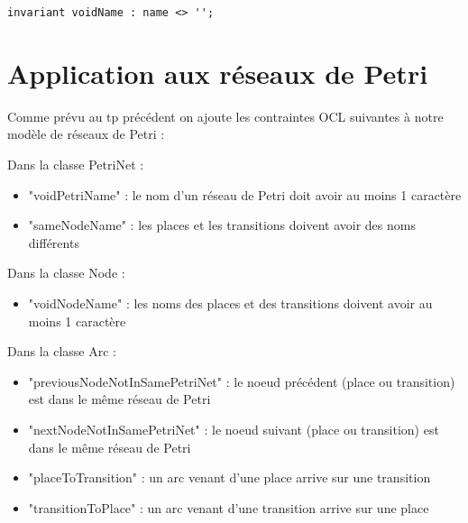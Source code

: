 \begin{lstlisting}[caption="voidName" in WorkDefinition class]
invariant voidName : name <> '';
\end{lstlisting}

\section{Application aux réseaux de Petri}

Comme prévu au tp précédent on ajoute les contraintes OCL suivantes à notre modèle de réseaux de Petri :

Dans la classe PetriNet :
\begin{itemize}
   \item "voidPetriName" : le nom d'un réseau de Petri doit avoir au moins 1 caractère
   \item "sameNodeName" : les places et les transitions doivent avoir des noms différents
\end{itemize}

Dans la classe Node :
\begin{itemize}
   \item "voidNodeName" : les noms des places et des transitions doivent avoir au moins 1 caractère
\end{itemize}

Dans la classe Arc :
\begin{itemize}
   \item "previousNodeNotInSamePetriNet" : le noeud précédent (place ou transition) est dans le même réseau de Petri
   \item "nextNodeNotInSamePetriNet" : le noeud suivant (place ou transition) est dans le même réseau de Petri
   \item "placeToTransition" : un arc venant d'une place arrive sur une transition
   \item "transitionToPlace" : un arc venant d'une transition arrive sur une place
\end{itemize}


